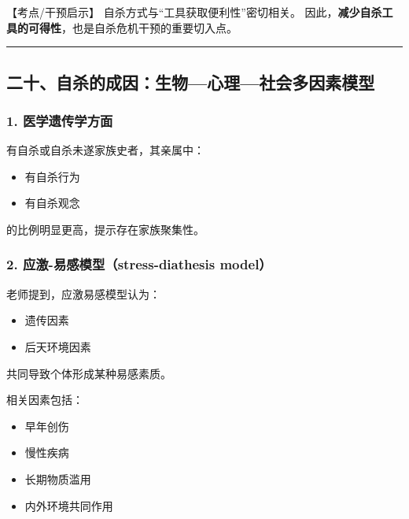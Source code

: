 \documentclass[
  chinese,
  9pt,
  a4paper,
]{ctexart}
\providecommand{\tightlist}{%
  \setlength{\itemsep}{0pt}\setlength{\parskip}{0pt}}
\begin{document}
【考点/干预启示】 自杀方式与``工具获取便利性''密切相关。
因此，\textbf{减少自杀工具的可得性}，也是自杀危机干预的重要切入点。

\begin{center}\rule{0.5\linewidth}{0.5pt}\end{center}

\subsection{二十、自杀的成因：生物---心理---社会多因素模型}\label{ux4e8cux5341ux81eaux6740ux7684ux6210ux56e0ux751fux7269ux5fc3ux7406ux793eux4f1aux591aux56e0ux7d20ux6a21ux578b}

\subsubsection{1.
医学遗传学方面}\label{ux533bux5b66ux9057ux4f20ux5b66ux65b9ux9762}

有自杀或自杀未遂家族史者，其亲属中：

\begin{itemize}
\tightlist
\item
  有自杀行为
\item
  有自杀观念
\end{itemize}

的比例明显更高，提示存在家族聚集性。

\subsubsection{2. 应激-易感模型（stress-diathesis
model）}\label{ux5e94ux6fc0-ux6613ux611fux6a21ux578bstress-diathesis-model}

老师提到，应激易感模型认为：

\begin{itemize}
\tightlist
\item
  遗传因素
\item
  后天环境因素
\end{itemize}

共同导致个体形成某种易感素质。

相关因素包括：

\begin{itemize}
\tightlist
\item
  早年创伤
\item
  慢性疾病
\item
  长期物质滥用
\item
  内外环境共同作用
\end{itemize}
\end{document}

